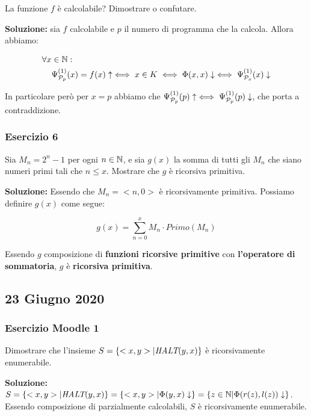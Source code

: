 La funzione \(f\) è calcolabile? Dimostrare o confutare.

\textbf{Soluzione: } sia \(f\) calcolabile e \(p\) il numero di programma che la calcola. Allora abbiamo:

\begin{equation}
  \begin{split}
    \forall x &\in \mathbb{N}:\\
    &\Psi_{\mathcal{P}_p}^{(1)}(x) = f(x) \uparrow \iff x \in K \iff \Phi(x,x) \downarrow \iff \Psi_{\mathcal{P}_x}^{(1)}(x) \downarrow
  \end{split}
\end{equation}

In particolare però per \(x=p\) abbiamo che \(\Psi_{\mathcal{P}_p}^{(1)}(p) \uparrow \iff \Psi_{\mathcal{P}_p}^{(1)}(p)  \downarrow\), che porta a contraddizione.

\subsubsection{Esercizio 6}

Sia \(M_n=2^n -1\) per ogni \(n \in \mathbb{N}\), e sia \(g(x)\) la somma di tutti gli \(M_n\) che siano numeri primi tali che \(n \leq x\). Mostrare che \(g\) è ricorsiva primitiva.

\textbf{Soluzione: } Essendo che \(M_n=<n,0>\) è ricorsivamente primitiva. Possiamo definire \(g(x)\) come segue:

\begin{equation}
  g(x) = \sum_{n=0}^{x} M_n \cdot Primo(M_n)
\end{equation}

Essendo \(g\) composizione di \textbf{funzioni ricorsive primitive} con \textbf{l'operatore di sommatoria}, \(g\) è \textbf{ricorsiva primitiva}.

\subsection{23 Giugno 2020}

\subsubsection{Esercizio Moodle 1}

Dimostrare che l'insieme \(S=\displaystyle{\left\{{<x,y> \vert \textit{HALT}(y,x)}\right\}}\) è ricorsivamente enumerabile.

\textbf{Soluzione: } \(S=\displaystyle{\left\{{<x,y> \vert \textit{HALT}(y,x)}\right\}}=\displaystyle{\left\{{<x,y> \vert \Phi(y,x) \downarrow}\right\}}= \displaystyle{\left\{{z \in \mathbb{N}\vert \Phi(r(z), l(z)) \downarrow}\right\}}\). Essendo composizione di parzialmente calcolabili, \(S\) è ricorsivamente enumerabile.

